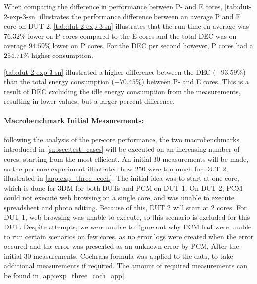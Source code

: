 When comparing the difference in performance between P- and E cores, \cref{tab:dut-2-exp-3-sn} illustrates the performance difference between an average P and E core on DUT 2. \cref{tab:dut-2-exp-3-sn} illustrates that the run time on average was $76.32\%$ lower on P-cores compared to the E-cores and the total DEC was on average $94.59\%$ lower on P cores. For the DEC per second however, P cores had a $254.71\%$ higher consumption. 

\cref{tab:dut-2-exp-3-sn} illustrated a higher difference between the DEC ($-93.59\%$) than the total energy consumption ($-70.45\%$) between P- and E cores. This is a result of DEC excluding the idle energy consumption from the measurements, resulting in lower values, but a larger percent difference. %







\paragraph*{Macrobenchmark Initial Measurements:} following the analysis of the per-core performance, the two macrobenchmarks introduced in \cref{subsec:test_cases} will be executed on an increasing number of cores, starting from the most efficient. An initial $30$ measurements will be made, as the per-core experiment illustrated how $250$ were too much for DUT 2, illustrated in \cref{app:exp_three_coch}. The initial idea was to start at one core, which is done for 3DM for both DUTs and PCM on DUT 1. On DUT 2, PCM could not execute web browsing on a single core, and was unable to execute spreadsheet and photo editing. Because of this, DUT 2 will start at 2 cores. For DUT 1, web browsing was unable to execute, so this scenario is excluded for this DUT. Despite attempts, we were unable to figure out why PCM had were unable to run certain scenarios on few cores, as no error logs were created when the error occured and the error was presented as an unknown error by PCM. After the initial $30$ measurements, Cochrans formula was applied to the data, to take additional measurements if required. The amount of required measurements can be found in \cref{app:exp_three_coch_app}.


